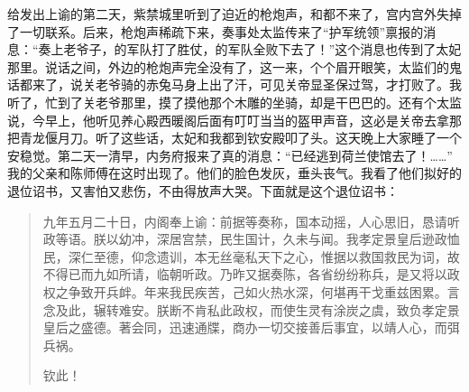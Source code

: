 给发出上谕的第二天，紫禁城里听到了迫近的枪炮声，和都不来了，宫内宫外失掉了一切联系。后来，枪炮声稀疏下来，奏事处太监传来了“护军统领”禀报的消息：“奏上老爷子，的军队打了胜仗，的军队全败下去了！”这个消息也传到了太妃那里。说话之间，外边的枪炮声完全没有了，这一来，个个眉开眼笑，太监们的鬼话都来了，说关老爷骑的赤兔马身上出了汗，可见关帝显圣保过驾，才打败了。我听了，忙到了关老爷那里，摸了摸他那个木雕的坐骑，却是干巴巴的。还有个太监说，今早上，他听见养心殿西暖阁后面有叮叮当当的盔甲声音，这必是关帝去拿那把青龙偃月刀。听了这些话，太妃和我都到钦安殿叩了头。这天晚上大家睡了一个安稳觉。第二天一清早，内务府报来了真的消息：“已经逃到荷兰使馆去了！……”\\

我的父亲和陈师傅在这时出现了。他们的脸色发灰，垂头丧气。我看了他们拟好的退位诏书，又害怕又悲伤，不由得放声大哭。下面就是这个退位诏书：\\

\begin{quote}
	九年五月二十日，内阁奉上谕：前据等奏称，国本动摇，人心思旧，恳请听政等语。朕以幼冲，深居宫禁，民生国计，久未与闻。我孝定景皇后逊政恤民，深仁至德，仰念遗训，本无丝毫私天下之心，惟据以救国救民为词，故不得已而九如所请，临朝听政。乃昨又据奏陈，各省纷纷称兵，是又将以政权之争致开兵衅。年来我民疾苦，己如火热水深，何堪再干戈重兹困累。言念及此，辗转难安。朕断不肯私此政权，而使生灵有涂炭之虞，致负孝定景皇后之盛德。著会同，迅速通牒，商办一切交接善后事宜，以靖人心，而弭兵祸。\\

\begin{flushright}
	钦此！\\
\end{flushright}
\end{quote}
